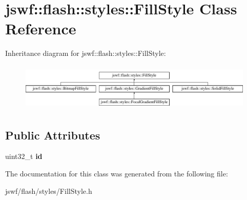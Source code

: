 \hypertarget{classjswf_1_1flash_1_1styles_1_1_fill_style}{\section{jswf\+:\+:flash\+:\+:styles\+:\+:Fill\+Style Class Reference}
\label{classjswf_1_1flash_1_1styles_1_1_fill_style}
}
Inheritance diagram for jswf\+:\+:flash\+:\+:styles\+:\+:Fill\+Style\+:\begin{figure}[H]
\begin{center}
\leavevmode
\includegraphics[height=2.295082cm]{classjswf_1_1flash_1_1styles_1_1_fill_style}
\end{center}
\end{figure}
\subsection*{Public Attributes}
\begin{DoxyCompactItemize}
\item 
\hypertarget{classjswf_1_1flash_1_1styles_1_1_fill_style_a68e25e6e215713f1b0b20da0d8b3be8b}{uint32\+\_\+t {\bfseries id}}\label{classjswf_1_1flash_1_1styles_1_1_fill_style_a68e25e6e215713f1b0b20da0d8b3be8b}

\end{DoxyCompactItemize}


The documentation for this class was generated from the following file\+:\begin{DoxyCompactItemize}
\item 
jswf/flash/styles/Fill\+Style.\+h\end{DoxyCompactItemize}
